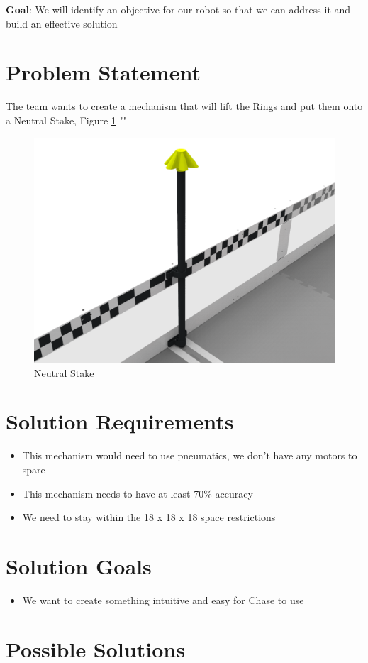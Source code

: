 \textbf{Goal}: We will identify an objective for our robot so that we can address it and build an effective solution
\section*{Problem Statement}
The team wants to create a mechanism that will lift the Rings and put them onto a Neutral Stake, Figure \ref{fig:neutral-stake} "\cite{RECF}"
\begin{figure}[H]
    \centering
    \includegraphics[width=0.5\linewidth]{images/Neutral Stake.png}
    \caption{Neutral Stake}
    \label{fig:neutral-stake}
\end{figure}
\section*{Solution Requirements}
\begin{itemize}
    \item This mechanism would need to use pneumatics, we don't have any motors to spare
    \item This mechanism needs to have at least 70\% accuracy 
    \item We need to stay within the 18 x 18 x 18 space restrictions 
\end{itemize}
\section*{Solution Goals}
\begin{itemize}
    \item We want to create something intuitive and easy for Chase to use
\end{itemize}
\section*{Possible Solutions}

